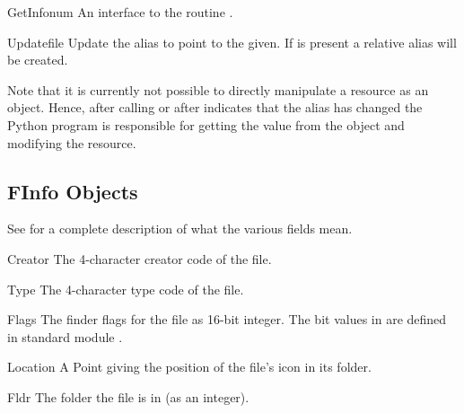 \begin{methoddesc}[Alias]{GetInfo}{num}
An interface to the \C{} routine .
\end{methoddesc}

\begin{methoddesc}[Alias]{Update}{file}
Update the alias to point to the  given. If  is
present a relative alias will be created.
\end{methoddesc}

Note that it is currently not possible to directly manipulate a
resource as an  object. Hence, after calling
 or after  indicates that the alias
has changed the Python program is responsible for getting the
 value from the  object and modifying the
resource.


\subsection{FInfo Objects \label{finfo-objects}}

See  for a complete description of what
the various fields mean.

\begin{memberdesc}[FInfo]{Creator}
The 4-character creator code of the file.
\end{memberdesc}

\begin{memberdesc}[FInfo]{Type}
The 4-character type code of the file.
\end{memberdesc}

\begin{memberdesc}[FInfo]{Flags}
The finder flags for the file as 16-bit integer. The bit values in
 are defined in standard module .
\end{memberdesc}

\begin{memberdesc}[FInfo]{Location}
A Point giving the position of the file's icon in its folder.
\end{memberdesc}

\begin{memberdesc}[FInfo]{Fldr}
The folder the file is in (as an integer).
\end{memberdesc}
